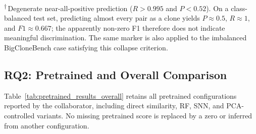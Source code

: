 \documentclass[authoryear,final,5p,times,twocolumn]{elsarticle}
\theoremstyle{plain}
\begin{document}
\begin{table}[t]
{\begin{tabular}{@{}l*{16}{c}@{}}
\bottomrule
\end{tabular}%
}
\vspace{2pt}
\begin{minipage}{\textwidth}
\footnotesize
\textsuperscript{\ensuremath{\dagger}}\,Degenerate near-all-positive
prediction ($R>0.995$ and $P<0.52$). On a class-balanced test set, predicting
almost every pair as a clone yields $P\approx0.5$, $R\approx1$, and
$F1\approx0.667$; the apparently non-zero F1 therefore does not indicate
meaningful discrimination. The same marker is also applied to the imbalanced
BigCloneBench case satisfying this collapse criterion.
\end{minipage}
\end{table}

\subsection{RQ2: Pretrained and Overall Comparison}
\label{sec:rq2}

Table~\ref{tab:pretrained_results_overall} retains all pretrained configurations
reported by the collaborator, including direct similarity, RF, SNN, and
PCA-controlled variants. No missing pretrained score is replaced by a zero or
inferred from another configuration.
\end{document}
